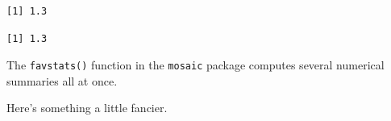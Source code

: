 \begin{knitrout}
{\begin{kframe}
\begin{flushleft}
\normalfont
\end{flushleft}
\begin{verbatim}
[1] 1.3
\end{verbatim}
\begin{flushleft}
\ttfamily\noindent
{}\hlkeyword{(}\hlkeyword{\usebox{\hlnormalsizeboxdollar}}\hlkeyword{)}\mbox{}
\normalfont
\end{flushleft}
\begin{verbatim}
[1] 1.3
\end{verbatim}
\end{kframe}}
\end{knitrout}


The \verb!favstats()! function in the \verb!mosaic! package computes several numerical 
summaries all at once.

\begin{knitrout}
\end{knitrout}


Here's something a little fancier.

